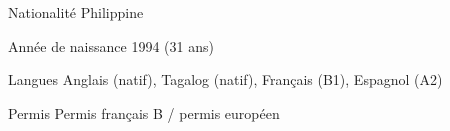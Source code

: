 
\begin{cvskills}

    \cvskill
{Nationalit\'e}
    {Philippine}

    \cvskill
{Ann\'ee de naissance}
    {1994 (31 ans)}

    \cvskill
{Langues}
    {Anglais (natif), Tagalog (natif), Fran\c{c}ais (B1), Espagnol (A2)}

    \cvskill
{Permis}
    {Permis fran\c{c}ais B / permis europ\'een}

\end{cvskills}
